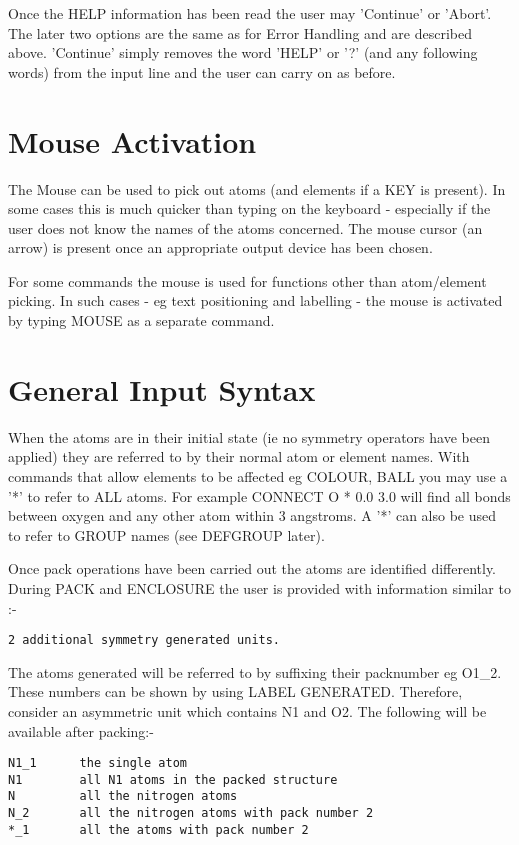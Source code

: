 \documentclass[10pt,a4paper]{report}
\begin{document}
Once the HELP information has been read the user may 'Continue' or
'Abort'.
The later two options are the same as for Error Handling and
are described above. 'Continue' simply removes the word 'HELP' or '?' (and any
following words) from the input line and the user can carry on as
before.
\section{Mouse Activation}


The Mouse can be used to pick out atoms (and elements if a KEY is
present). In some cases this is much quicker than typing on the keyboard
- especially if the user does not know the names of the atoms concerned.
The mouse cursor (an arrow) is present once an appropriate output device has
been chosen.


For some commands the mouse is used for functions other than
atom/element picking. In such cases - eg text positioning and labelling -
the mouse is activated by typing MOUSE as a separate command.



\section{General Input Syntax}


When the atoms are in their initial state (ie no symmetry operators
have been applied) they are referred to by their normal atom or element
names. With commands that allow elements to be affected eg
COLOUR, BALL you may use a '*' to refer to ALL atoms. For example CONNECT 
O * 0.0 3.0 will find all bonds between oxygen and any other atom within
3 angstroms. A '*' can also be used to refer to GROUP names (see DEFGROUP 
later).


Once pack operations have been carried out the atoms are
identified differently. During PACK and ENCLOSURE the user is provided
with information similar to :-
\small\begin{verbatim}
2 additional symmetry generated units.
\end{verbatim}\normalsize


The atoms generated will be referred to by suffixing their packnumber 
eg O1\_2. These numbers 
can be shown by using LABEL GENERATED. Therefore, consider an asymmetric
unit which contains N1 and O2. The following will be available after
packing:-

\small\begin{verbatim}
N1_1      the single atom
N1        all N1 atoms in the packed structure
N         all the nitrogen atoms
N_2       all the nitrogen atoms with pack number 2
*_1       all the atoms with pack number 2
\end{verbatim}\normalsize
\end{document}
